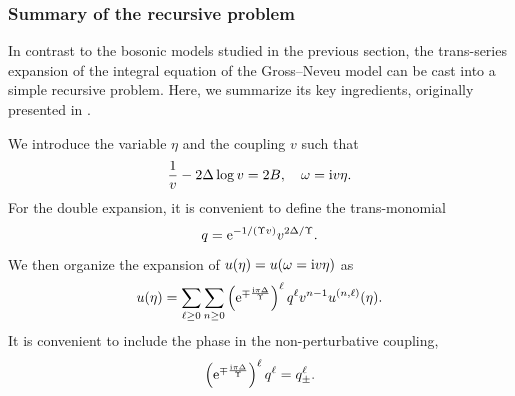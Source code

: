 \documentclass[a4paper,11pt]{article}
\theoremstyle{definition}
\newcommand{\re}{{\rm e}}
\newcommand{\ri}{{\rm i}}
\begin{document}
\subsubsection{Summary of the recursive problem}
\label{gn-sum}

In contrast to the bosonic models studied in the previous section, the trans-series expansion of the integral equation 
of the Gross--Neveu model can be cast into a simple recursive problem. Here, we summarize its key 
ingredients, originally presented in \cite{mmr-an}.
 
We introduce the variable $\eta$ and the coupling $v$ such that
\begin{equation}
\frac{1}{v}-2\Delta\log v = 2B, \quad \omega = \ri v\eta.
\label{v-def}
\end{equation}
For the double expansion, it is convenient to define the trans-monomial
\begin{equation}
q= \re^{-1/(\Upsilon v)}v^{2\Delta/\Upsilon}.%
\end{equation}
We then organize the expansion of $u(\eta) = u(\omega=\ri v \eta)$ as
\begin{equation}
u(\eta) = \sum_{\ell\geq 0} \sum_{n\geq 0}
 \left(\re^{\mp\frac{\ri\pi\Delta}{\Upsilon}}\right)^{\ell}  q^\ell v^{n-1} u^{(n,\ell)}(\eta).
\end{equation}
It is convenient to include the phase in the non-perturbative coupling,
\begin{equation}
\left(\re^{\mp\frac{\ri\pi\Delta}{\Upsilon}}\right)^{\ell}  q^\ell = q_\pm^\ell.
\end{equation}
\end{document}
